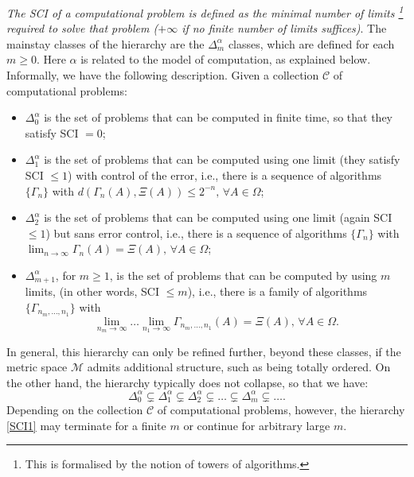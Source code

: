 \documentclass[10pt, a4paper, reqno]{amsart}
\numberwithin{equation}{section}
\renewcommand{\geq}{\geqslant}
\renewcommand{\leq}{\leqslant}
\theoremstyle{definition}
\theoremstyle{definition}
\begin{document}
\emph{The SCI of a computational problem is defined as the minimal number of limits \footnote{This is formalised by the notion of towers of algorithms.} required to solve that problem ($+\infty$ if no finite number of limits suffices)}. The mainstay classes of the hierarchy are the $\Delta_{m}^{\alpha}$ classes, which are defined for each $m \geq 0$. Here $\alpha$ is related to the model of computation, as explained below. Informally, we have the following description. Given a collection $\mathcal{C}$ of computational problems:
\begin{itemize}
\item[(i)] $\Delta^{\alpha}_0$ is the set of problems that can be computed in finite time, so that they satisfy SCI $=0$;
\item[(ii)] $\Delta^{\alpha}_1$ is the set of problems that can be computed using one limit (they satisfy SCI $\leq1$) with control of the error, i.e., there is a sequence of algorithms $\{\Gamma_n\}$ with $d(\Gamma_n(A), \Xi(A)) \leq 2^{-n}, \, \forall A \in \Omega$;
\item[(iii)] $\Delta^{\alpha}_2$ is the set of problems that can be computed using one limit (again SCI $\leq 1$) but sans error control, i.e., there is a sequence of algorithms $\{\Gamma_n\}$ with $\lim_{n\rightarrow \infty}\Gamma_n(A) = \Xi(A), \, \forall A \in \Omega$;
\item[(iv)] $\Delta^{\alpha}_{m+1}$, for $m \geq 1$, is the set of problems that can be computed by using $m$ limits, (in other words, SCI $\leq m$), i.e., there is a family of algorithms $\{\Gamma_{n_m, \hdots, n_1}\}$ with 
$$
\lim_{n_m \rightarrow\infty}\hdots \lim_{n_1\rightarrow\infty}\Gamma_{n_m,\hdots, n_1}(A) = \Xi(A), \, \forall A \in \Omega.
$$
\end{itemize}
In general, this hierarchy can only be refined further, beyond these classes, if the metric space $\mathcal{M}$ admits additional structure, such as being totally ordered. On the other hand, the hierarchy typically does not collapse, so that we have:
\begin{equation}\label{SCI1}
 \Delta_0^{\alpha} \subsetneq \Delta_1^{\alpha} \subsetneq \Delta_2^{\alpha} \subsetneq \hdots \subsetneq \Delta^{\alpha}_{m} \subsetneq \hdots.
\end{equation}
Depending on the collection $\mathcal{C}$ of computational problems, however, the hierarchy \eqref{SCI1} may terminate for a finite $m$ or continue for arbitrary large $m$. 
\end{document}
